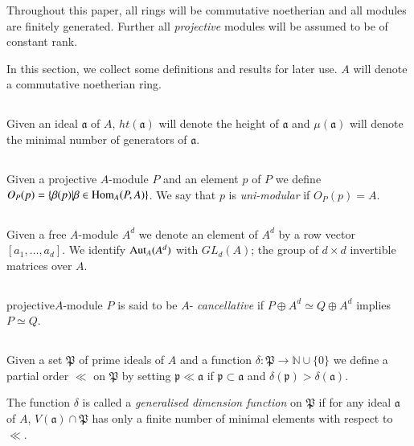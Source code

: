 Throughout this paper, all rings will be commutative noetherian and
all modules are finitely generated. Further all {\em projective}
modules will be assumed to be of constant rank.

In this section, we collect some definitions and results for later
use. $A$ will denote a commutative noetherian ring.

\subsection{}\label{chap3-sec2.1}
Given an ideal $\mathfrak{a}$ of $A$, $ht(\mathfrak{a})$ will denote
the height of $\mathfrak{a}$ and $\mu(\mathfrak{a})$ will denote the
minimal number of generators of $\mathfrak{a}$.

\subsection{}\label{chap3-sec2.2}
Given a projective $A$-module $P$ and an element $p$ of $P$ we define
$O_{P}(p)=\{\beta(p)|\beta\in \operatorname{Hom}_{A}(P,A)\}$. We say that $p$ is
{\em uni-modular} if $O_{P}(p)=A$. 

\subsection{}\label{chap3-sec2.3}
Given a free $A$-module $A^{d}$ we denote an element of $A^{d}$ by a
row vector $[a_{1},\ldots,a_{d}]$. We identify $\operatorname{Aut}_{A}(A^{d})$ with
$GL_{d}(A)$; the group of $d\times d$ invertible matrices over $A$. 

\subsection{}\label{chap3-sec2.4}
projective\pageoriginale $A$-module $P$ is said to be $A$-{\em
cancellative} if $P\oplus A^{d}\simeq Q\oplus A^{d}$ implies $P\simeq
Q$. 

\subsection{}\label{chap3-sec2.5}
Given a set $\mathfrak{P}$ of prime ideals of $A$ and a function
$\delta:\mathfrak{P}\to \mathbb{N}\cup \{0\}$ we define a partial
order $\ll$ on $\mathfrak{P}$ by setting
$\mathfrak{p}\ll \mathfrak{a}$ if $\mathfrak{p}\subset \mathfrak{a}$
and $\delta(\mathfrak{p})>\delta (\mathfrak{a})$. 

The function $\delta$ is called a {\em generalised dimension function}
on $\mathfrak{P}$ if for any ideal $\mathfrak{a}$ of $A$,
$V(\mathfrak{a})\cap \mathfrak{P}$ has only a finite number of minimal
elements with respect to $\ll$.

